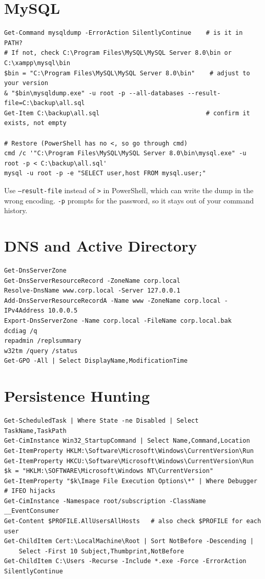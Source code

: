 \documentclass[11pt]{article}
\newcommand{\cmd}[1]{\texttt{\small #1}}
\begin{document}
\section*{MySQL}
{\footnotesize
\begin{verbatim}
Get-Command mysqldump -ErrorAction SilentlyContinue    # is it in PATH?
# If not, check C:\Program Files\MySQL\MySQL Server 8.0\bin or C:\xampp\mysql\bin
$bin = "C:\Program Files\MySQL\MySQL Server 8.0\bin"    # adjust to your version
& "$bin\mysqldump.exe" -u root -p --all-databases --result-file=C:\backup\all.sql
Get-Item C:\backup\all.sql                             # confirm it exists, not empty

# Restore (PowerShell has no <, so go through cmd)
cmd /c '"C:\Program Files\MySQL\MySQL Server 8.0\bin\mysql.exe" -u root -p < C:\backup\all.sql'
mysql -u root -p -e "SELECT user,host FROM mysql.user;"
\end{verbatim}
}
\noindent Use \cmd{--result-file} instead of \cmd{>} in PowerShell, which can write the dump in the wrong encoding. \cmd{-p} prompts for the password, so it stays out of your command history.

\section*{DNS and Active Directory}
{\footnotesize
\begin{verbatim}
Get-DnsServerZone
Get-DnsServerResourceRecord -ZoneName corp.local
Resolve-DnsName www.corp.local -Server 127.0.0.1
Add-DnsServerResourceRecordA -Name www -ZoneName corp.local -IPv4Address 10.0.0.5
Export-DnsServerZone -Name corp.local -FileName corp.local.bak
dcdiag /q
repadmin /replsummary
w32tm /query /status
Get-GPO -All | Select DisplayName,ModificationTime
\end{verbatim}
}

\section*{Persistence Hunting}
{\footnotesize
\begin{verbatim}
Get-ScheduledTask | Where State -ne Disabled | Select TaskName,TaskPath
Get-CimInstance Win32_StartupCommand | Select Name,Command,Location
Get-ItemProperty HKLM:\Software\Microsoft\Windows\CurrentVersion\Run
Get-ItemProperty HKCU:\Software\Microsoft\Windows\CurrentVersion\Run
$k = "HKLM:\SOFTWARE\Microsoft\Windows NT\CurrentVersion"
Get-ItemProperty "$k\Image File Execution Options\*" | Where Debugger   # IFEO hijacks
Get-CimInstance -Namespace root/subscription -ClassName __EventConsumer
Get-Content $PROFILE.AllUsersAllHosts   # also check $PROFILE for each user
Get-ChildItem Cert:\LocalMachine\Root | Sort NotBefore -Descending |
    Select -First 10 Subject,Thumbprint,NotBefore
Get-ChildItem C:\Users -Recurse -Include *.exe -Force -ErrorAction SilentlyContinue
\end{verbatim}
}
\end{document}
